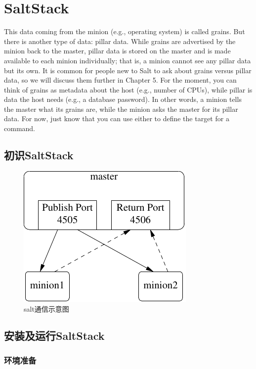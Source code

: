 \chapter{SaltStack}
\label{chap:chapSalt}

This data coming from the minion (e.g., operating system) is called
grains. But there is another type of data: pillar data. While grains
are advertised by the minion back to the master, pillar data is stored
on the master and is made available to each minion individually; that
is, a minion cannot see any pillar data but its own. It is common for
people new to Salt to ask about grains versus pillar data, so we will
discuss them further in Chapter 5. For the moment, you can think of
grains as metadata about the host (e.g., number of CPUs), while pillar
is data the host needs (e.g., a database password). In other words, a
minion tells the master what its grains are, while the minion asks the
master for its pillar data. For now, just know that you can use either
to define the target for a command.

\section{初识SaltStack}
\label{sec:basicSalt}

\begin{figure}[!htbp]
  \centering
  \includegraphics{graph/saltstack_communication.pdf}
  \caption{salt通信示意图}
  \label{fig:saltRelition}
\end{figure}

\section{安装及运行SaltStack}
\label{sec:installSalt}

\subsection{环境准备}
\label{sec:saltEnvPrepare}

